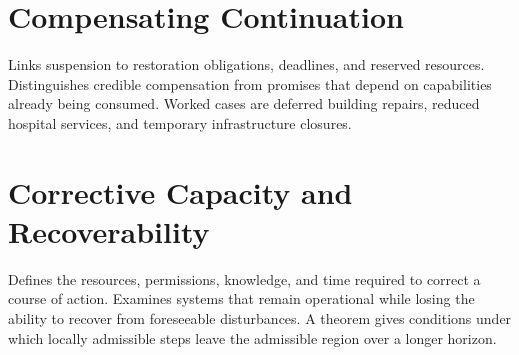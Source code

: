 \chapter{Compensating Continuation}\label{ch:14}
Links suspension to restoration obligations, deadlines, and reserved resources. Distinguishes credible compensation from promises that depend on capabilities already being consumed. Worked cases are deferred building repairs, reduced hospital services, and temporary infrastructure closures.
\scaffold

\chapter{Corrective Capacity and Recoverability}\label{ch:15}
Defines the resources, permissions, knowledge, and time required to correct a course of action. Examines systems that remain operational while losing the ability to recover from foreseeable disturbances. A theorem gives conditions under which locally admissible steps leave the admissible region over a longer horizon.
\scaffold

